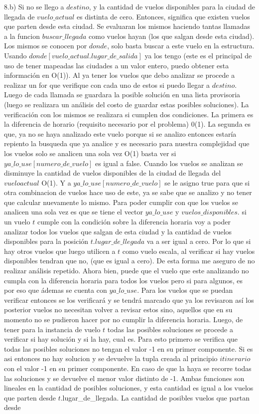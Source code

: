 \documentclass[a4paper]{article}
\begin{document}
8.b) Si no se llego a $destino$, y la cantidad de vuelos disponibles para la ciudad de llegada de $vuelo\_actual$ es distinta de cero. Entonces, significa que existen vuelos que parten desde esta ciudad. Se evaluaran los mismos haciendo tantas llamadas a la funcion $buscar\_llegada$ como vuelos hayan (los que salgan desde esta ciudad). Los mismos se conocen por $donde$, solo basta buscar a este vuelo en la estructura. Usando $donde[vuelo\_actual.lugar\_de\_salida]$ ya los tengo (este es el principal de uso de tener mapeadas las ciudades a un valor entero, puedo obtener esta información en O(1)). Al ya tener los vuelos que debo analizar se procede a realizar un for que verifique con cada uno de estos si puedo llegar a $destino$. Luego de cada llamada se guardara la posible solución en una lista provisoria (luego se realizara un análisis del costo de guardar estas posibles soluciones). La verificación con los mismos se realizara si cumplen dos condiciones. La primera es la diferencia de horario (requisito necesario por el problema) 0(1). La segunda es que, ya no se haya analizado este vuelo porque si se analizo entonces estaría repiento la busqueda que ya analice y es necesario para nuestra complejidad que los vuelos solo se analicen una sola vez O(1) basta ver si $ya\_lo\_use[numero\_de\_vuelo]$ es igual a false. Cuando los vuelos se analizan se disminuye la cantidad de vuelos disponibles de la ciudad de llegada del $vuelo actual$ O(1). Y a $ya\_lo\_use[numero\_de\_vuelo]$ se le asigno true para que si otra combinacion de vuelos hace uso de este, ya se sabe que se analizo y no tener que calcular nuevamente lo mismo. Para poder cumplir con que los vuelos se analicen una sola vez es que se tiene el vector $ya\_lo\_use$ y $vuelos\_disponibles$. si un vuelo $t$ cumple con la condición sobre la diferencia horaria voy a poder analizar todos los vuelos que salgan de esta ciudad y la cantidad de vuelos disponibles para la posición $t.lugar\_de\_llegada$ va a ser igual a cero. Por lo que si hay otros vuelos que luego utilicen a $t$ como vuelo escala, al verificar si hay vuelos disponibles tendran que no, (que es igual a cero). De esta forma me aseguro de no realizar análisis repetido. Ahora bien, puede que el vuelo que este analizando no cumpla con la diferencia horaria para todos los vuelos pero si para algunos, es por eso que ádemas se cuenta con $ya\_lo\_use$. Para los vuelos que se puedan verificar entonces se los verificará y se tendrá marcado que ya los revisaron así los posterior vuelos no necesitan volver a revisar estos sino, aquellos que en su momento no se pudieron hacer por no cumplir la diferencia horaria. Luego, de tener para la instancia de vuelo $t$ todas las posibles soluciones se procede a verificar si hay solución y si la hay, cual es. Para esto primero se verifica que todas las posibles soluciones no tengan el valor -1 en su primer componente. Si es asi entonces no hay solucion y se devuelve la tupla creada al principio $itinerario$ con el valor -1 en su primer componente. En caso de que la haya se recorre todas las soluciones y se devuelve el menor valor distinto de -1. Ambas funciones son lineales en la cantidad de posibles soluciones, y esta cantidad es igual a los vuelos que parten desde $t$.lugar\_de\_llegada. La cantidad de posibles vuelos que partan desde 
\end{document}
